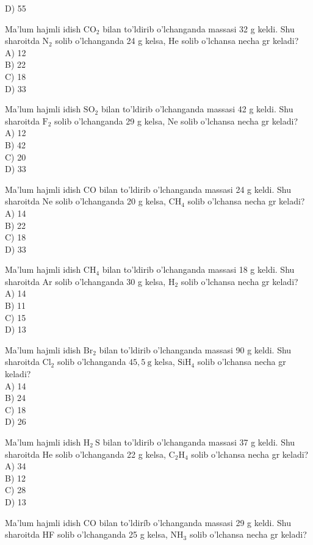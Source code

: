 D) 55
  \item Ma'lum hajmli idish $\mathrm{CO}_{2}$ bilan to'ldirib o'lchanganda massasi 32 g keldi. Shu sharoitda $\mathrm{N}_{2}$ solib o'lchanganda 24 g kelsa, He solib o'lchansa necha gr keladi?\\
A) 12\\
B) 22\\
C) 18\\
D) 33
  \item Ma'lum hajmli idish $\mathrm{SO}_{2}$ bilan to'ldirib o'lchanganda massasi 42 g keldi. Shu sharoitda $\mathrm{F}_{2}$ solib o'lchanganda 29 g kelsa, Ne solib o'lchansa necha gr keladi?\\
A) 12\\
B) 42\\
C) 20\\
D) 33
  \item Ma'lum hajmli idish CO bilan to'ldirib o'lchanganda massasi 24 g keldi. Shu sharoitda Ne solib o'lchanganda 20 g kelsa, $\mathrm{CH}_{4}$ solib o'lchansa necha gr keladi?\\
A) 14\\
B) 22\\
C) 18\\
D) 33
  \item Ma'lum hajmli idish $\mathrm{CH}_{4}$ bilan to'ldirib o'lchanganda massasi 18 g keldi. Shu sharoitda Ar solib o'lchanganda 30 g kelsa, $\mathrm{H}_{2}$ solib o'lchansa necha gr keladi?\\
A) 14\\
B) 11\\
C) 15\\
D) 13
  \item Ma'lum hajmli idish $\mathrm{Br}_{2}$ bilan to'ldirib o'lchanganda massasi 90 g keldi. Shu sharoitda $\mathrm{Cl}_{2}$ solib o'lchanganda $45,5 \mathrm{~g}$ kelsa, $\mathrm{SiH}_{4}$ solib o'lchansa necha gr keladi?\\
A) 14\\
B) 24\\
C) 18\\
D) 26
  \item Ma'lum hajmli idish $\mathrm{H}_{2} \mathrm{~S}$ bilan to'ldirib o'lchanganda massasi 37 g keldi. Shu sharoitda He solib o'lchanganda 22 g kelsa, $\mathrm{C}_{2} \mathrm{H}_{4}$ solib o'lchansa necha gr keladi?\\
A) 34\\
B) 12\\
C) 28\\
D) 13
  \item Ma'lum hajmli idish CO bilan to'ldiríb o'lchanganda massasi 29 g keldi. Shu sharoitda HF solib o'lchanganda 25 g kelsa, $\mathrm{NH}_{3}$ solib o'lchansa necha gr keladi?\\
